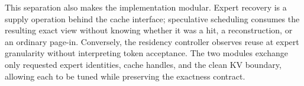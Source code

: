 This separation also makes the implementation modular. Expert recovery is a supply
operation behind the cache interface; speculative scheduling consumes the resulting
exact view without knowing whether it was a hit, a reconstruction, or an ordinary
page-in. Conversely, the residency controller observes reuse at expert granularity
without interpreting token acceptance. The two modules exchange only requested
expert identities, cache handles, and the clean KV boundary, allowing each to be
tuned while preserving the exactness contract.
